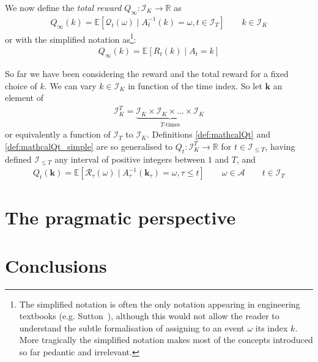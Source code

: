 \documentclass[]{scrartcl}
\begin{document}
We now define the \emph{total reward} $Q_{\infty}: \mathcal{I}_K \rightarrow \mathbb{R}$ as
\begin{align}\label{def:mathcalQinf}
Q_{\infty}(k) = \mathbb{E} \left[ \mathcal{Q}_{t}(\omega) \mid A^{-1}_{t}(k) = \omega, t \in \mathcal{I}_T \right]
\qquad
k \in \mathcal{I}_K 
\end{align}
or with the simplified notation as\footnote{
    The simplified notation is often the only notation appearing in engineering textbooks (e.g. Sutton~\cite{sutton2018reinforcement}), although this would not allow the reader to understand the subtle formalisation of assigning to an event $\omega$ its index $k$. More tragically the simplified notation makes most of the concepts introduced so far pedantic and irrelevant.
}:
\begin{align}\label{def:mathcalQinf_simple}
Q_{\infty}(k) = \mathbb{E} \left[ R_{t}(k) \mid A_{t} = k \right]
\end{align}

So far we have been considering the reward and the total reward for a fixed choice of $k$. We can vary $k\in \mathcal{I}_K$ in function of the time index. So let $\mathbf{k}$ an element of
\begin{align*}
\mathcal{I}_K^T = \underbrace{\mathcal{I}_K\times \mathcal{I}_K \times \dots \times \mathcal{I}_K}_{T\text{-times}}
\end{align*}
or equivalently a function of $\mathcal{I}_T$ to $\mathcal{I}_K$. 
Definitions \ref{def:mathcalQt} and \ref{def:mathcalQt_simple} are so generalised to $Q_t:\mathcal{I}_K^T \rightarrow \mathbb{R}$ for $t\in\mathcal{I}_{\leq T}$, having defined $\mathcal{I}_{\leq T}$ any interval of positive integers between $1$ and $T$, and
\begin{align*}
Q_t(\mathbf{k}) = \mathbb{E} \left[ \mathcal{R}_{\tau}(\omega)
\mid
A^{-1}_{\tau}(\mathbf{k}_{\tau}) = \omega, \tau \leq t \right]
\qquad 
\omega \in \mathcal{A}
\qquad
t \in \mathcal{I}_T
\end{align*}




\section{The pragmatic perspective}
\label{se:pragmatic_perspective}


\section{Conclusions}
\label{se:outro}



 

\end{document}
